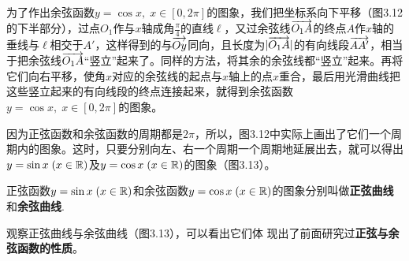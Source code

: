 \begin{figure}[htp]
    \caption{}
\end{figure}




为了作出余弦函数$y=\cos x,\; x\in [0,2\pi]$的图象，我们把坐标系向下平移（图3.12的下半部分），过点$O_1$作与$x$轴成角$\frac{\pi}{4}$的直线$\ell$，又过余弦线$\overrightarrow{O_1A}$的终点$A$作$x$轴的垂线与$\ell$相交于$A'$，这样得到的与$\overrightarrow{Oy}$同向，且长度为$|\overrightarrow{O_1A}|$的有向线段$\overrightarrow{AA'}$，相当于把余弦线$\overrightarrow{O_1A}$“竖立”起来了。同样的方法，将其余的余弦线都“竖立”起来。再将它们向右平移，使角$x$对应的余弦线的起点与$x$轴上的点$x$重合，最后用光滑曲线把这些竖立起来的有向线段的终点连接起来，就得到余弦函数$y=\cos x,\; x\in[0,2\pi]$的图象。

因为正弦函数和余弦函数的周期都是$2\pi$，所以，图3.12中实际上画出了它们一个周期内的图象。这时，只要分别向左、右一个周期一个周期地延展出去，就可以得出$y=\sin x\; (x\in\mathbb{R})$及$y=\cos x\; (x\in\mathbb{R})$的图象（图3.13）。

正弦函数$y=\sin x\; (x\in\mathbb{R})$和余弦函数$y=\cos x\; (x\in\mathbb{R})$的图象分别叫做\textbf{正弦曲线}和\textbf{余弦曲线}.

观察正弦曲线与余弦曲线（图3.13），可以看出它们体
现出了前面研究过\textbf{正弦与余弦函数的性质}。

